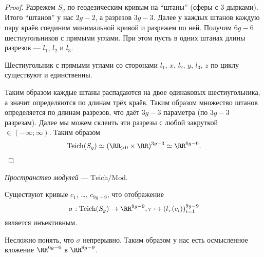 \documentclass[12pt,a4paper]{article}
\newcommand{\Mod}{\mathrm{Mod}}
\newcommand{\Teich}{\mathrm{Teich}}
\begin{document}
    \begin{proof}
        Разрежем $S_g$ по геодезическим кривым на ``штаны'' (сферы с 3 дырками). Итого ``штанов'' у нас $2g-2$, а разрезов $3g-3$. Далее у каждых штанов каждую пару краёв соединим минимальной кривой и разрежем по ней. Получим $6g-6$ шестиугольников с прямыми углами. При этом пусть в одних штанах длины разрезов --- $l_1$, $l_2$ и $l_3$.
        
        \begin{lemma}
            Шестиугольник с прямыми углами со сторонами $l_1$, $x$, $l_2$, $y$, $l_3$, $z$ по циклу существуют и единственны.
        \end{lemma}

        Таким образом каждые штаны распадаются на двое одинаковых шестиугольника, а значит определяются по длинам трёх краёв. Таким образом множество штанов определяется по длинам разрезов, что даёт $3g-3$ параметра (по $3g-3$ разрезам). Далее мы можем склеить эти разрезы с любой закруткой $\in (-\infty; \infty)$. Таким образом
        \[\Teich(S_g) \simeq (\RR_{>0} \times \RR)^{3g-3} \simeq \RR^{6g-6}.\]
    \end{proof}

    \begin{definition}
        \emph{Пространство модулей} --- $\Teich / \Mod$.
    \end{definition}

    \begin{theorem}[$9g-9$-теорема]
        Существуют кривые $c_1$, \dots, $c_{9g-9}$, что отображение
        \[\sigma: \Teich(S_g) \to \RR^{9g-9}, \tau \mapsto (l_\tau(c_i))_{i=1}^{9g-9}\]
        является инъективным. 
    \end{theorem}

    \begin{remark}
        Несложно понять, что $\sigma$ непрерывно. Таким образом у нас есть осмысленное вложение $\RR^{6g-6}$ в $\RR^{9g-9}$.
    \end{remark}
\end{document}
